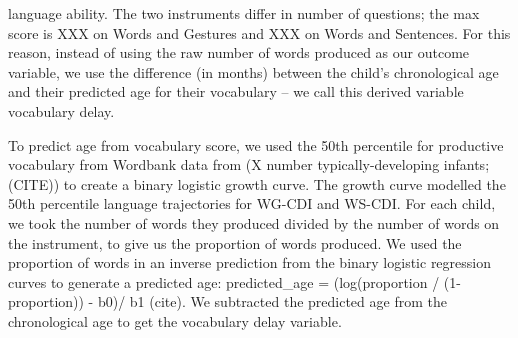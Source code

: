 \documentclass[english,man]{apa6}
\begin{document}
 language ability. The two instruments differ in number of questions; the max score is XXX on Words and Gestures and XXX on Words and Sentences. For this reason, instead of using the raw number of words produced as our outcome variable, we use the difference (in months) between the child's chronological age and their predicted age for their vocabulary -- we call this derived variable vocabulary delay.

To predict age from vocabulary score, we used the 50th percentile for productive vocabulary from Wordbank data from (X number typically-developing infants; (CITE)) to create a binary logistic growth curve. The growth curve modelled the 50th percentile language trajectories for WG-CDI and WS-CDI. For each child, we took the number of words they produced divided by the number of words on the instrument, to give us the proportion of words produced. We used the proportion of words in an inverse prediction from the binary logistic regression curves to generate a predicted age: predicted\_age = (log(proportion / (1-proportion)) - b0)/ b1 (cite). We subtracted the predicted age from the chronological age to get the vocabulary delay variable.
\end{document}
